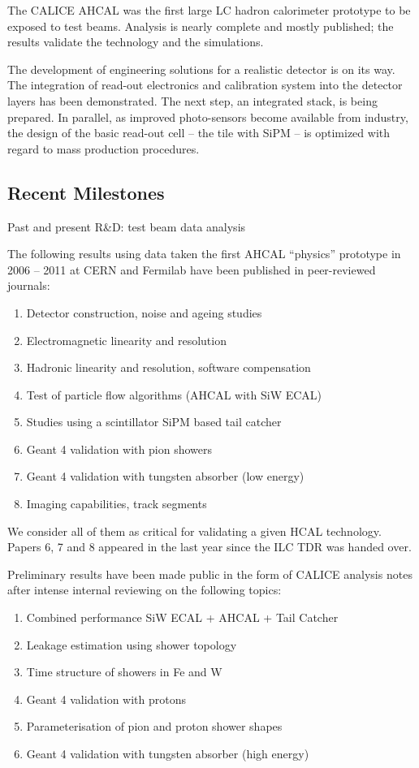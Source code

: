 The CALICE AHCAL was the first large LC hadron calorimeter prototype to be exposed to test beams. Analysis is nearly complete and mostly published; the results validate the technology and the simulations.

The development of engineering solutions for a realistic detector is on its way. The integration of read-out electronics and calibration system into the detector layers has been demonstrated. The next step, an integrated stack, is being prepared. In parallel, as improved photo-sensors become available from industry, the design of the basic read-out cell -- the tile with SiPM -- is optimized with regard to mass production procedures.

\subsection{Recent Milestones}
Past and present R\&D: test beam data analysis

The following results using data taken the first AHCAL ``physics'' prototype in 2006 -- 2011 at CERN and Fermilab have been published in peer-reviewed journals:
\begin{enumerate}
\item Detector construction, noise and ageing studies
\item Electromagnetic linearity and resolution
\item Hadronic linearity and resolution, software compensation
\item Test of particle flow algorithms (AHCAL with SiW ECAL)
\item Studies using a scintillator SiPM based tail catcher
\item Geant 4 validation with pion showers
\item Geant 4 validation with tungsten absorber (low energy)
\item Imaging capabilities, track segments
\end{enumerate}

We consider all of them as critical for validating a given HCAL technology. Papers 6, 7 and 8 appeared in the last year since the ILC TDR was handed over. 

Preliminary results have been made public in the form of CALICE analysis notes after intense internal reviewing on the following topics:
\begin{enumerate}
\item Combined performance SiW ECAL + AHCAL + Tail Catcher   
\item Leakage estimation using shower topology  
\item Time structure of showers in Fe and W  
\item Geant 4 validation with protons   
\item Parameterisation of pion and proton shower shapes 
\item Geant 4 validation with tungsten absorber (high energy)
\end{enumerate}

